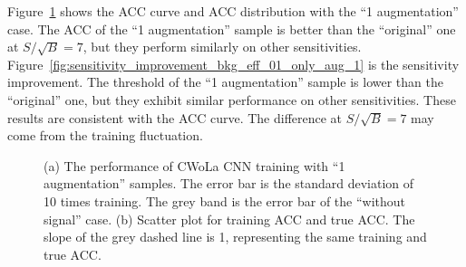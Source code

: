 \documentclass[12pt]{article}
\begin{document}
        Figure~\ref{fig:cwola_cnn_training_performance_only_aug_1} shows the ACC curve and ACC distribution with the ``1 augmentation'' case. The ACC of the ``1 augmentation'' sample is better than the ``original'' one at $S / \sqrt{B}=7$, but they perform similarly on other sensitivities. Figure~\ref{fig:sensitivity_improvement_bkg_eff_01_only_aug_1} is the sensitivity improvement. The threshold of the ``1 augmentation'' sample is lower than the ``original'' one, but they exhibit similar performance on other sensitivities. These results are consistent with the ACC curve. The difference at $S / \sqrt{B}=7$ may come from the training fluctuation. 
        \begin{figure}[htpb]
            \centering
            \caption{(a) The performance of CWoLa CNN training with ``1 augmentation'' samples. The error bar is the standard deviation of 10 times training. The grey band is the error bar of the ``without signal'' case. (b) Scatter plot for training ACC and true ACC. The slope of the grey dashed line is 1, representing the same training and true ACC.}
            \label{fig:cwola_cnn_training_performance_only_aug_1}
        \end{figure}
\end{document}
